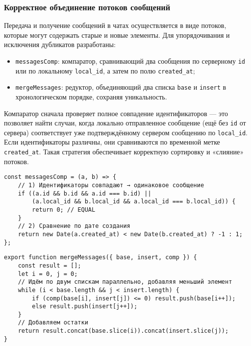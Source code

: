 \subsubsection{Корректное объединение потоков сообщений}
Передача и получение сообщений в чатах осуществляется в виде потоков, которые могут содержать старые и новые элементы. Для упорядочивания и исключения дубликатов разработаны:
\begin{itemize}
  \item \texttt{messagesComp}: компаратор, сравнивающий два сообщения по серверному \texttt{id} или по локальному \texttt{local\_id}, а затем по полю \texttt{created\_at};
  \item \texttt{mergeMessages}: редуктор, объединяющий два списка \texttt{base} и \texttt{insert} в хронологическом порядке, сохраняя уникальность.
\end{itemize}
Компаратор сначала проверяет полное совпадение идентификаторов — это позволяет найти случаи, когда локально отправленное сообщение (ещё без \texttt{id} от сервера) соответствует уже подтверждённому сервером сообщению по \texttt{local\_id}. Если идентификаторы различны, они сравниваются по временной метке \texttt{created\_at}. Такая стратегия обеспечивает корректную сортировку и «слияние» потоков.

\begin{lstlisting}[caption={Компаратор сообщений messagesComp}, label={lst:messagesComp}]
const messagesComp = (a, b) => {
    // 1) Идентификаторы совпадают → одинаковое сообщение
    if ((a.id && b.id && a.id === b.id) ||
        (a.local_id && b.local_id && a.local_id === b.local_id)) {
        return 0; // EQUAL
    }
    // 2) Сравнение по дате создания
    return new Date(a.created_at) < new Date(b.created_at) ? -1 : 1;
};
\end{lstlisting}

\begin{lstlisting}[caption={Функция слияния mergeMessages}, label={lst:mergeMessages}]
export function mergeMessages({ base, insert, comp }) {
    const result = [];
    let i = 0, j = 0;
    // Идём по двум спискам параллельно, добавляя меньший элемент
    while (i < base.length && j < insert.length) {
        if (comp(base[i], insert[j]) <= 0) result.push(base[i++]);
        else result.push(insert[j++]);
    }
    // Добавляем остатки
    return result.concat(base.slice(i)).concat(insert.slice(j));
}
\end{lstlisting}

